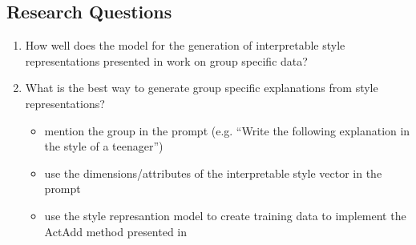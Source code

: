 \subsection{Research Questions}
\begin{enumerate}
  \item How well does the model for the generation of interpretable style representations presented in \citet{patelLearningInterpretableStyle2023} work on group specific data?
  \item What is the best way to generate group specific explanations from style representations?
  \begin{itemize}
    \item mention the group in the prompt (e.g. \enquote{Write the following explanation in the style of a teenager})
    \item use the dimensions/attributes of the interpretable style vector in the prompt
    \item use the style represantion model to create training data to implement the ActAdd method presented in \citet{turnerActivationAdditionSteering2024}
  \end{itemize}
\end{enumerate}
